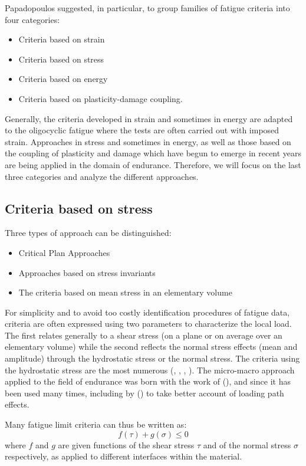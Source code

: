 Papadopoulos suggested, in particular, to group families of fatigue criteria into four categories:
\begin{itemize}
	\item Criteria based on strain
	\item Criteria based on stress
	\item Criteria based on energy
	\item Criteria based on plasticity-damage coupling.
\end{itemize}
Generally, the criteria developed in strain and sometimes in energy are adapted to the oligocyclic fatigue where the tests are often carried out with imposed strain. Approaches in stress and sometimes in energy, as well as those based on the coupling of plasticity and damage which have begun to emerge in recent years are being applied in the domain of endurance. Therefore, we will focus on the last three categories and analyze the different approaches.

\subsection{Criteria based on stress}
\vspace{6pt}

Three types of approach can be distinguished:
\begin{itemize}
	\item Critical Plan Approaches
	\item Approaches based on stress invariants
	\item The criteria based on mean stress in an elementary volume
\end{itemize}
For simplicity and to avoid too costly identification procedures of fatigue data, criteria are often expressed using two
parameters to characterize the local load. The first relates generally to a shear stress (on a plane or on average over an elementary volume) while
the second reflects the normal stress effects (mean and amplitude) through the hydrostatic stress or the normal stress.
The criteria using the hydrostatic stress are the most numerous (\cite{crossland1956effect}, \cite{sines1959behavior}, \cite{FFE:FFE452}, \cite{thu2008effet}). The micro-macro approach applied to the field of endurance was born with the work of (\cite{van1973khmu}), and since it has been used many times, including by (\cite{papadopoulos1993fatigue}) to take better account of loading path effects.


Many fatigue limit criteria can thus be written as:
\begin{equation}
f(\tau)+g(\sigma) \leqslant 0
\label{eq.generalfatigue}
\end{equation}
where $f$ and $g$ are given functions of the shear stress $\tau$ and of the normal stress $\sigma$ respectively, as applied to different interfaces within the material.  

